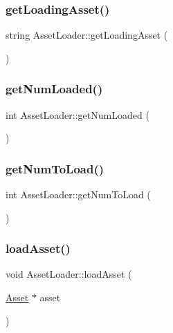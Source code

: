 \subsubsection{\texorpdfstring{get\+Loading\+Asset()}{getLoadingAsset()}}
{\footnotesize\ttfamily string Asset\+Loader\+::get\+Loading\+Asset (\begin{DoxyParamCaption}{ }\end{DoxyParamCaption})}

\hypertarget{class_asset_loader_a2b6e924a1ded0e1758a608757e6886fe}{}\label{class_asset_loader_a2b6e924a1ded0e1758a608757e6886fe} 
\subsubsection{\texorpdfstring{get\+Num\+Loaded()}{getNumLoaded()}}
{\footnotesize\ttfamily int Asset\+Loader\+::get\+Num\+Loaded (\begin{DoxyParamCaption}{ }\end{DoxyParamCaption})}

\hypertarget{class_asset_loader_a5c122cf239d342643f38bb9dd3de7996}{}\label{class_asset_loader_a5c122cf239d342643f38bb9dd3de7996} 
\subsubsection{\texorpdfstring{get\+Num\+To\+Load()}{getNumToLoad()}}
{\footnotesize\ttfamily int Asset\+Loader\+::get\+Num\+To\+Load (\begin{DoxyParamCaption}{ }\end{DoxyParamCaption})}

\hypertarget{class_asset_loader_acf07e2074a4c86f3312d2c162ae5a40b}{}\label{class_asset_loader_acf07e2074a4c86f3312d2c162ae5a40b} 
\subsubsection{\texorpdfstring{load\+Asset()}{loadAsset()}}
{\footnotesize\ttfamily void Asset\+Loader\+::load\+Asset (\begin{DoxyParamCaption}\item[{\hyperlink{struct_asset}{Asset} $\ast$}]{asset }\end{DoxyParamCaption})}

